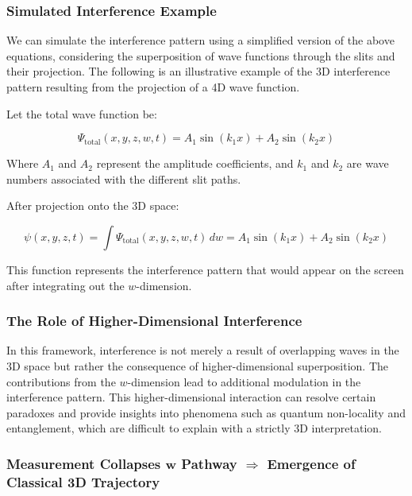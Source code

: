 \documentclass[12pt]{article}
\begin{document}
\subsubsection*{Simulated Interference Example}

We can simulate the interference pattern using a simplified version of the above equations, considering the superposition of wave functions through the slits and their projection. The following is an illustrative example of the 3D interference pattern resulting from the projection of a 4D wave function.

Let the total wave function be:

\begin{equation}
\Psi_{\text{total}}(x, y, z, w, t) = A_1 \sin(k_1 x) + A_2 \sin(k_2 x)
\end{equation}

Where \( A_1 \) and \( A_2 \) represent the amplitude coefficients, and \( k_1 \) and \( k_2 \) are wave numbers associated with the different slit paths.

After projection onto the 3D space:

\begin{equation}
\psi(x, y, z, t) = \int \Psi_{\text{total}}(x, y, z, w, t) \, dw = A_1 \sin(k_1 x) + A_2 \sin(k_2 x)
\end{equation}

This function represents the interference pattern that would appear on the screen after integrating out the \( w \)-dimension.

\subsubsection*{The Role of Higher-Dimensional Interference}

In this framework, interference is not merely a result of overlapping waves in the 3D space but rather the consequence of higher-dimensional superposition. The contributions from the \( w \)-dimension lead to additional modulation in the interference pattern. This higher-dimensional interaction can resolve certain paradoxes and provide insights into phenomena such as quantum non-locality and entanglement, which are difficult to explain with a strictly 3D interpretation.

\subsubsection{Measurement Collapses $\bm{w}$ Pathway $\Rightarrow$ Emergence of Classical 3D Trajectory}
\end{document}
